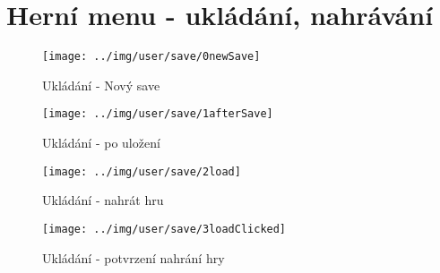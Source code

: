 
\section{Herní menu - ukládání, nahrávání}



\begin{figure}[h!]\centering
\texttt{[image: ../img/user/save/0newSave]}

\caption{Ukládání - Nový save}
\label{fig:user_save_0newSave}

\end{figure}

\begin{figure}[h!]\centering
\texttt{[image: ../img/user/save/1afterSave]}

\caption{Ukládání - po uložení}
\label{fig:user_save_1afterSave}

\end{figure}

\begin{figure}[h!]\centering
\texttt{[image: ../img/user/save/2load]}

\caption{Ukládání - nahrát hru}
\label{fig:user_save_2load}

\end{figure}


\begin{figure}[h!]\centering
\texttt{[image: ../img/user/save/3loadClicked]}

\caption{Ukládání - potvrzení nahrání hry}
\label{fig:user_save_3loadClicked}

\end{figure}

